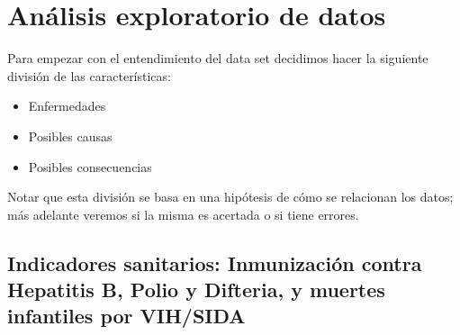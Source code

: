 \newpage
\section{Análisis exploratorio de datos}

Para empezar con el entendimiento del data set decidimos hacer la siguiente división de las características:
\begin{itemize}
    \item Enfermedades
    \item Posibles causas
    \item Posibles consecuencias
\end{itemize}
Notar que esta división se basa en una hipótesis de cómo se relacionan los datos; más adelante veremos si la misma es acertada o si tiene errores.

\subsection{Indicadores sanitarios: Inmunización contra Hepatitis B, Polio y Difteria, y muertes infantiles por VIH/SIDA}
